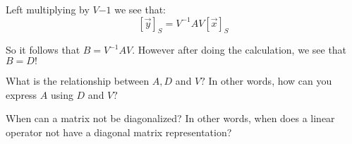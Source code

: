 \begin{enumerate}
{  Left multiplying by $V{-1}$ we see that:
  $$[\vec{y}]_S = V^{-1} A V[\vec{x}]_S$$

  So it follows that $B = V^{-1} A V.$ \vskip 1pt
  However after doing the calculation, we see that $B = D!$
}

\qitem What is the relationship between $A, D$ and $V?$ In other words, how can you express $A$ using $D$ and $V?$


\qitem When can a matrix not be diagonalized? 
In other words, when does a linear operator not have a diagonal matrix representation?


\end{enumerate}
